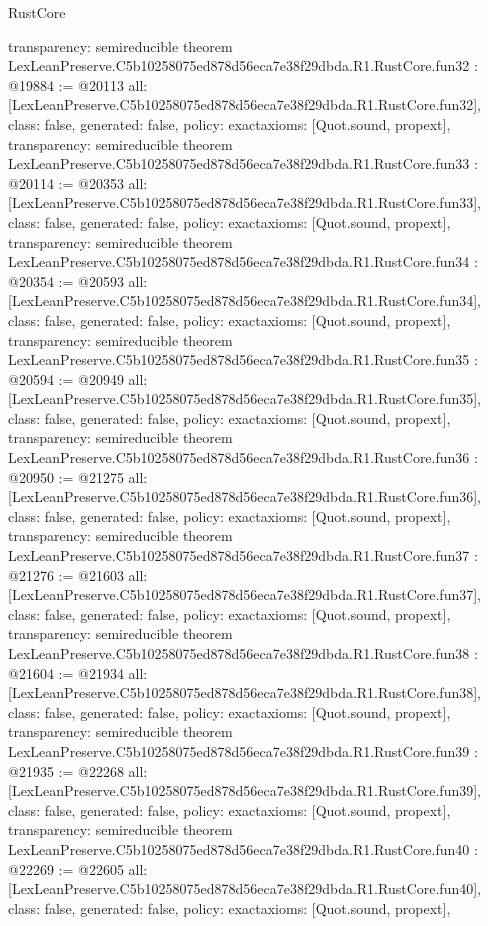 \begin{lexlean}{RustCore}
\begin{coremodule}
{  transparency: semireducible
}
theorem LexLeanPreserve.C5b10258075ed878d56eca7e38f29dbda.R1.RustCore.fun32 : @19884 := @20113 {
  all: [LexLeanPreserve.C5b10258075ed878d56eca7e38f29dbda.R1.RustCore.fun32],
  class: false,
  generated: false,
  policy: exact{axioms: [Quot.sound, propext]},
  transparency: semireducible
}
theorem LexLeanPreserve.C5b10258075ed878d56eca7e38f29dbda.R1.RustCore.fun33 : @20114 := @20353 {
  all: [LexLeanPreserve.C5b10258075ed878d56eca7e38f29dbda.R1.RustCore.fun33],
  class: false,
  generated: false,
  policy: exact{axioms: [Quot.sound, propext]},
  transparency: semireducible
}
theorem LexLeanPreserve.C5b10258075ed878d56eca7e38f29dbda.R1.RustCore.fun34 : @20354 := @20593 {
  all: [LexLeanPreserve.C5b10258075ed878d56eca7e38f29dbda.R1.RustCore.fun34],
  class: false,
  generated: false,
  policy: exact{axioms: [Quot.sound, propext]},
  transparency: semireducible
}
theorem LexLeanPreserve.C5b10258075ed878d56eca7e38f29dbda.R1.RustCore.fun35 : @20594 := @20949 {
  all: [LexLeanPreserve.C5b10258075ed878d56eca7e38f29dbda.R1.RustCore.fun35],
  class: false,
  generated: false,
  policy: exact{axioms: [Quot.sound, propext]},
  transparency: semireducible
}
theorem LexLeanPreserve.C5b10258075ed878d56eca7e38f29dbda.R1.RustCore.fun36 : @20950 := @21275 {
  all: [LexLeanPreserve.C5b10258075ed878d56eca7e38f29dbda.R1.RustCore.fun36],
  class: false,
  generated: false,
  policy: exact{axioms: [Quot.sound, propext]},
  transparency: semireducible
}
theorem LexLeanPreserve.C5b10258075ed878d56eca7e38f29dbda.R1.RustCore.fun37 : @21276 := @21603 {
  all: [LexLeanPreserve.C5b10258075ed878d56eca7e38f29dbda.R1.RustCore.fun37],
  class: false,
  generated: false,
  policy: exact{axioms: [Quot.sound, propext]},
  transparency: semireducible
}
theorem LexLeanPreserve.C5b10258075ed878d56eca7e38f29dbda.R1.RustCore.fun38 : @21604 := @21934 {
  all: [LexLeanPreserve.C5b10258075ed878d56eca7e38f29dbda.R1.RustCore.fun38],
  class: false,
  generated: false,
  policy: exact{axioms: [Quot.sound, propext]},
  transparency: semireducible
}
theorem LexLeanPreserve.C5b10258075ed878d56eca7e38f29dbda.R1.RustCore.fun39 : @21935 := @22268 {
  all: [LexLeanPreserve.C5b10258075ed878d56eca7e38f29dbda.R1.RustCore.fun39],
  class: false,
  generated: false,
  policy: exact{axioms: [Quot.sound, propext]},
  transparency: semireducible
}
theorem LexLeanPreserve.C5b10258075ed878d56eca7e38f29dbda.R1.RustCore.fun40 : @22269 := @22605 {
  all: [LexLeanPreserve.C5b10258075ed878d56eca7e38f29dbda.R1.RustCore.fun40],
  class: false,
  generated: false,
  policy: exact{axioms: [Quot.sound, propext]},
}
\end{coremodule}
\end{lexlean}
